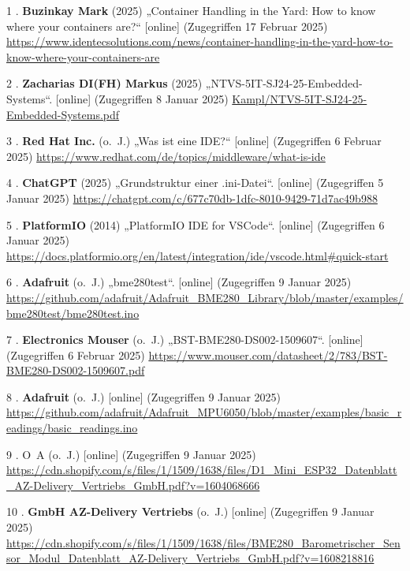\documentclass[
    headings=optiontotocandhead,%
    twoside,
    numbers=noenddot,%
    12pt, %
    titlepage, %
    parskip=full, %
    listof=leveldown, 
    numbers=noenddot, %
    a4paper,DIV=14,
    BCOR=15mm,
]{scrbook}
\newlength{\cslhangindent}
\newenvironment{cslreferences}%
  {\setlength{\parindent}{0pt}%
  \everypar{\setlength{\hangindent}{\cslhangindent}}\ignorespaces}%
  {\par}
\begin{document}
\hypertarget{refs}{}
\begin{cslreferences}
\leavevmode\hypertarget{ref-identecsolutions}{}%
1 . \textbf{Buzinkay Mark} (2025) „Container Handling in the Yard: How
to know where your containers are?{}`` {[}online{]} (Zugegriffen 17
Februar 2025)
\url{https://www.identecsolutions.com/news/container-handling-in-the-yard-how-to-know-where-your-containers-are}

\leavevmode\hypertarget{ref-EmbeddedSystems}{}%
2 . \textbf{Zacharias DI(FH) Markus} (2025)
„NTVS-5IT-SJ24-25-Embedded-Systems``. {[}online{]} (Zugegriffen 8 Januar
2025) \url{Kampl/NTVS-5IT-SJ24-25-Embedded-Systems.pdf}

\leavevmode\hypertarget{ref-RedHatIDE}{}%
3 . \textbf{Red Hat Inc.} (o.~J.) „Was ist eine IDE?{}`` {[}online{]}
(Zugegriffen 6 Februar 2025)
\url{https://www.redhat.com/de/topics/middleware/what-is-ide}

\leavevmode\hypertarget{ref-gpt-inifile}{}%
4 . \textbf{ChatGPT} (2025) „Grundstruktur einer .ini-Datei``.
{[}online{]} (Zugegriffen 5 Januar 2025)
\url{https://chatgpt.com/c/677c70db-1dfc-8010-9429-71d7ac49b988}

\leavevmode\hypertarget{ref-PlatformIO-firststeps}{}%
5 . \textbf{PlatformIO} (2014) „PlatformIO IDE for VSCode``.
{[}online{]} (Zugegriffen 6 Januar 2025)
\url{https://docs.platformio.org/en/latest/integration/ide/vscode.html\#quick-start}

\leavevmode\hypertarget{ref-BME280-Test}{}%
6 . \textbf{Adafruit} (o.~J.) „bme280test``. {[}online{]} (Zugegriffen 9
Januar 2025)
\url{https://github.com/adafruit/Adafruit_BME280_Library/blob/master/examples/bme280test/bme280test.ino}

\leavevmode\hypertarget{ref-BME280-Datasheet}{}%
7 . \textbf{Electronics Mouser} (o.~J.) „BST-BME280-DS002-1509607``.
{[}online{]} (Zugegriffen 6 Februar 2025)
\url{https://www.mouser.com/datasheet/2/783/BST-BME280-DS002-1509607.pdf}

\leavevmode\hypertarget{ref-MPU6050-Test}{}%
8 . \textbf{Adafruit} (o.~J.) {[}online{]} (Zugegriffen 9 Januar 2025)
\url{https://github.com/adafruit/Adafruit_MPU6050/blob/master/examples/basic_readings/basic_readings.ino}

\leavevmode\hypertarget{ref-ESP32-Datenblatt}{}%
9 . O~A (o.~J.) {[}online{]} (Zugegriffen 9 Januar 2025)
\url{https://cdn.shopify.com/s/files/1/1509/1638/files/D1_Mini_ESP32_Datenblatt_AZ-Delivery_Vertriebs_GmbH.pdf?v=1604068666}

\leavevmode\hypertarget{ref-BME280-Datenblatt}{}%
10 . \textbf{GmbH AZ-Delivery Vertriebs} (o.~J.) {[}online{]}
(Zugegriffen 9 Januar 2025)
\url{https://cdn.shopify.com/s/files/1/1509/1638/files/BME280_Barometrischer_Sensor_Modul_Datenblatt_AZ-Delivery_Vertriebs_GmbH.pdf?v=1608218816}


\end{cslreferences}
\end{document}
